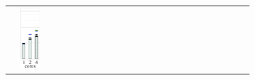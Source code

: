 \begin{tabular}{>{\scriptsize \bfseries}lcccccccccp{0.7cm}>{\scriptsize \bfseries}lccccccccccc}
  & 
  \includegraphics[height=2.3cm,clip=true]{images/perf/p-80/p-naples1-omen-rgf-tc4_5}%
\\
%
%
\end{tabular}
%